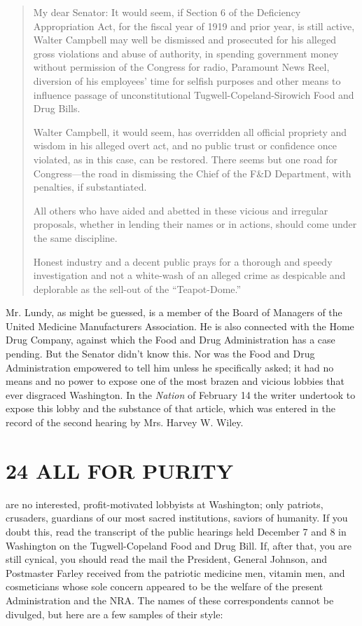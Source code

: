 \documentclass[twoside,nohyper,openany,nobib]{tufte-book}
\let\oldchapter\chapter
\def\chapter{%
  \setcounter{footnote}{0}%
  \oldchapter
}
\begin{document}
\begin{quote}
My dear Senator: It would seem, if Section 6 of the Deficiency
Appropriation Act, for the fiscal year of 1919 and prior year, is still
active, Walter Campbell may well be dismissed and prosecuted for his
alleged gross violations and abuse of authority, in spending government
money without permission of the Congress for radio, Paramount News Reel,
diversion of his employees' time for selfish purposes and other means to
influence passage of unconstitutional Tugwell-Copeland-Sirowich Food and
Drug Bills.

Walter Campbell, it would seem, has overridden all official propriety
and wisdom in his alleged overt act, and no public trust or confidence
once violated, as in this case, can be restored. There seems but one
road for Congress---the road in dismissing the Chief of the F\&D
Department, with penalties, if substantiated.

All others who have aided and abetted in these vicious and irregular
proposals, whether in lending their names or in actions, should come
under the same discipline.

Honest industry and a decent public prays for a thorough and speedy
investigation and not a white-wash of an alleged crime as despicable and
deplorable as the sell-out of the ``Teapot-Dome.''
\end{quote}

Mr. Lundy, as might be guessed, is a member of the Board of Managers of
the United Medicine Manufacturers Association. He is also connected with
the Home Drug Company, against which the Food and Drug Administration
has a case pending. But the Senator didn't know this. Nor was the Food
and Drug Administration empowered to tell him unless he specifically
asked; it had no means and no power to expose one of the most brazen and
vicious lobbies that ever disgraced Washington. In the \emph{Nation} of
February 14 the writer undertook to expose this lobby and the substance
of that article, which was entered in the record of the second hearing
by Mrs. Harvey W. Wiley.




\chapter[24 \hspace*{1mm} ALL FOR PURITY]{24 ALL FOR PURITY}

 are no interested, profit-motivated lobbyists at Washington; only
patriots, crusaders, guardians of our most sacred institutions, saviors
of humanity. If you doubt this, read the transcript of the public
hearings held December 7 and 8 in Washington on the Tugwell-Copeland
Food and Drug Bill. If, after that, you are still cynical, you should
read the mail the President, General Johnson, and Postmaster Farley
received from the patriotic medicine men, vitamin men, and cosmeticians
whose sole concern appeared to be the welfare of the present
Administration and the NRA. The names of these correspondents cannot be
divulged, but here are a few samples of their style:
\end{document}
